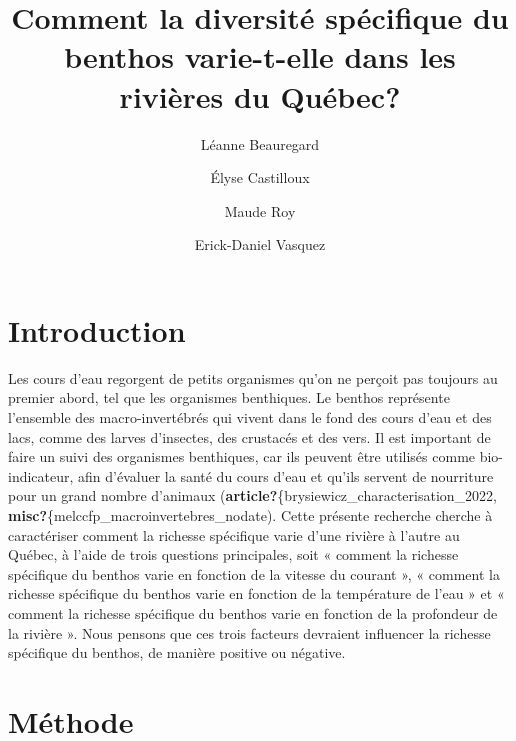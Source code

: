 \documentclass[9pt,twocolumn,twoside,]{pnas-new}
\title{Comment la diversité spécifique du benthos varie-t-elle dans les
rivières du Québec?}
\author[a]{Léanne Beauregard}
\author[a]{Élyse Castilloux}
\author[a]{Maude Roy}
\author[a]{Erick-Daniel Vasquez}
\affil[a]{Univeristé de Sherbrooke, Département de Biologie, Street,
City, State, Zip}
\begin{document}
\verticaladjustment{-2pt}



\maketitle
\thispagestyle{firststyle}


\acknow{}

\section{Introduction}\label{introduction}

Les cours d'eau regorgent de petits organismes qu'on ne perçoit pas
toujours au premier abord, tel que les organismes benthiques. Le benthos
représente l'ensemble des macro-invertébrés qui vivent dans le fond des
cours d'eau et des lacs, comme des larves d'insectes, des crustacés et
des vers. Il est important de faire un suivi des organismes benthiques,
car ils peuvent être utilisés comme bio-indicateur, afin d'évaluer la
santé du cours d'eau et qu'ils servent de nourriture pour un grand
nombre d'animaux (\textbf{article?}\{brysiewicz\_characterisation\_2022,
\textbf{misc?}\{melccfp\_macroinvertebres\_nodate). Cette présente
recherche cherche à caractériser comment la richesse spécifique varie
d'une rivière à l'autre au Québec, à l'aide de trois questions
principales, soit « comment la richesse spécifique du benthos varie en
fonction de la vitesse du courant », « comment la richesse spécifique du
benthos varie en fonction de la température de l'eau » et « comment la
richesse spécifique du benthos varie en fonction de la profondeur de la
rivière ». Nous pensons que ces trois facteurs devraient influencer la
richesse spécifique du benthos, de manière positive ou négative.

\section{Méthode}\label{muxe9thode}
\end{document}
